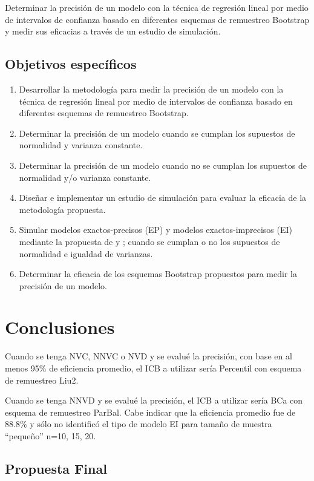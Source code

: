 
Determinar la precisión de un modelo con la técnica de regresión lineal por medio de intervalos de confianza basado en diferentes esquemas de remuestreo Bootstrap y medir sus eficacias a través de un estudio de simulación.
\subsection{Objetivos específicos}
\begin{enumerate}
	\item Desarrollar la metodología para medir la precisión de un modelo con la técnica de regresión lineal por medio de intervalos de confianza basado en diferentes esquemas de remuestreo Bootstrap.
	\item Determinar la precisión de un modelo cuando se cumplan los supuestos de normalidad y varianza constante.
	\item Determinar la precisión de un modelo cuando no se cumplan los supuestos de normalidad y/o varianza constante.
	\item Diseñar e implementar un estudio de simulación para evaluar la eficacia de la metodología propuesta.
	\item Simular modelos exactos-precisos (EP) y modelos exactos-imprecisos (EI) mediante la propuesta de \textcite{febles-2014} y \textcite{zacarias-2023}; cuando se cumplan o no los supuestos de normalidad e igualdad de varianzas.
	\item Determinar la eficacia de los esquemas Bootstrap propuestos para medir la precisión de un modelo.
\end{enumerate}



\section{Conclusiones}


Cuando se tenga NVC, NNVC o NVD y se evalué la precisión, con base en al menos 95\% de eficiencia promedio, el ICB a utilizar sería Percentil con esquema de remuestreo Liu2.

Cuando se tenga NNVD y se evalué la precisión, el ICB a utilizar sería BCa con esquema de remuestreo ParBal. Cabe indicar que la eficiencia promedio fue de 88.8\% y sólo no identificó el tipo de modelo EI para tamaño de muestra “pequeño” n=10, 15, 20.

\subsection{Propuesta Final}


